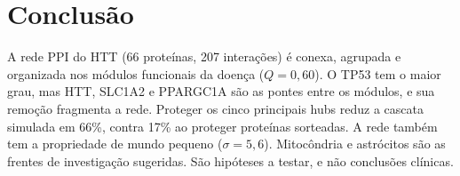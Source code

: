 \documentclass[12pt,a4paper]{article}
\begin{document}
\section{Conclusão}

A rede PPI do HTT (66 proteínas, 207 interações) é conexa, agrupada e organizada nos módulos funcionais da doença ($Q = 0{,}60$). O TP53 tem o maior grau, mas HTT, SLC1A2 e PPARGC1A são as pontes entre os módulos, e sua remoção fragmenta a rede. Proteger os cinco principais hubs reduz a cascata simulada em 66\%, contra 17\% ao proteger proteínas sorteadas. A rede também tem a propriedade de mundo pequeno ($\sigma = 5{,}6$). Mitocôndria e astrócitos são as frentes de investigação sugeridas. São hipóteses a testar, e não conclusões clínicas.
\end{document}
